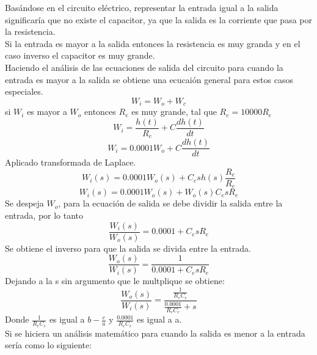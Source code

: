 \documentclass[12pt]{article}
\begin{document}
Basándose en el circuito eléctrico, representar la entrada igual a la salida significaría que no existe el capacitor, ya que la salida es la corriente que pasa por la resistencia.\\
Si la entrada es mayor a la salida entonces la resistencia es muy granda y en el caso inverso el capacitor es muy grande.\\
Haciendo el análisis de las ecuaciones de salida del circuito para cuando la entrada es mayor a la salida se obtiene una ecucaión general para estos casos especiales.\\
\begin{equation*}
W_i = W_o + W_c
\end{equation*}
si $W_i$ es mayor a $W_o$ entonces $R_e$ es muy grande, tal que $R_e = 10000R_e$
\begin{equation*}
W_i = \frac{h(t)}{R_e} + C\frac{dh(t)}{dt}
\end{equation*}
\begin{equation*}
W_i = 0.0001W_o + C\frac{dh(t)}{dt}
\end{equation*}
Aplicado transformada de Laplace.\\
\begin{equation*}
W_i (s) = 0.0001W_o (s) + C_e s h(s)\frac{R_e}{R_e}
\end{equation*}
\begin{equation*}
W_i (s) = 0.0001W_o(s) + W_o (s) C_e s R_e
\end{equation*}
Se despeja $W_o$, para la ecuación de salida se debe dividir la salida entre la entrada, por lo tanto\\
\begin{equation*}
\frac{W_i (s)}{W_o (s)} = 0.0001 + C_e s R_e
\end{equation*}
Se obtiene el inverso para que la salida se divida entre la entrada.\\
\begin{equation*}
\frac{W_o (s)}{W_i(s)} = \frac{1}{0.0001 + C_e s R_e}
\end{equation*}
Dejando a la s sin argumento que le multplique se obtiene:
\begin{equation*}
\frac{W_o (s)}{W_i (s)} = \frac{\frac{1}{R_e C_e}}{\frac{0.0001}{R_e C_e} + s}
\end{equation*}
Donde $\frac{1}{R_e C_e}$ es igual a $b-\frac{c}{a}$ y $\frac{0.0001}{R_e C_e}$ es igual a a.\\
 Si se hiciera un análisis matemático para cuando la salida es menor a la entrada sería como lo siguiente:\\
\end{document}
